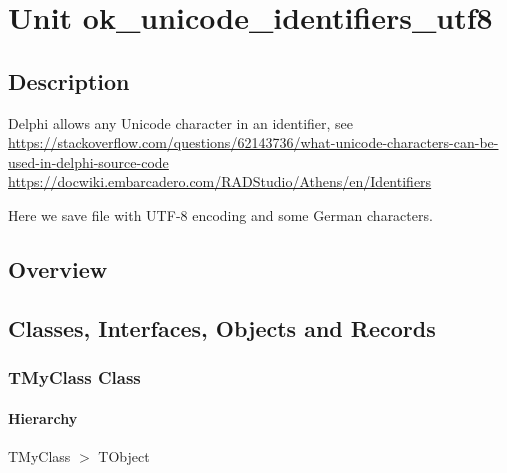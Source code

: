 \documentclass{report}
\newif\ifpdf
\begin{document}
\label{toc}\tableofcontents
\newpage
\newlength{\tmplength}
\chapter{Unit ok{\_}unicode{\_}identifiers{\_}utf8}
\label{ok_unicode_identifiers_utf8}
\section{Description}
Delphi allows any Unicode character in an identifier, see \href{https://stackoverflow.com/questions/62143736/what-unicode-characters-can-be-used-in-delphi-source-code}{https://stackoverflow.com/questions/62143736/what-unicode-characters-can-be-used-in-delphi-source-code} \href{https://docwiki.embarcadero.com/RADStudio/Athens/en/Identifiers}{https://docwiki.embarcadero.com/RADStudio/Athens/en/Identifiers}

Here we save file with UTF{-}8 encoding and some German characters.
\section{Overview}
\begin{description}
\item[\texttt{\begin{ttfamily}TMyClass\end{ttfamily} Class}]
\item[\texttt{\begin{ttfamily}TfrmArbeitsÜbersicht\end{ttfamily} Class}]
\end{description}
\section{Classes, Interfaces, Objects and Records}
\ifpdf
\subsection*{\large{\textbf{TMyClass Class}}\normalsize\hspace{1ex}\hrulefill}
\else
\subsection*{TMyClass Class}
\fi
\label{ok_unicode_identifiers_utf8.TMyClass}
\subsubsection*{\large{\textbf{Hierarchy}}\normalsize\hspace{1ex}\hfill}
TMyClass {$>$} TObject
\end{document}
